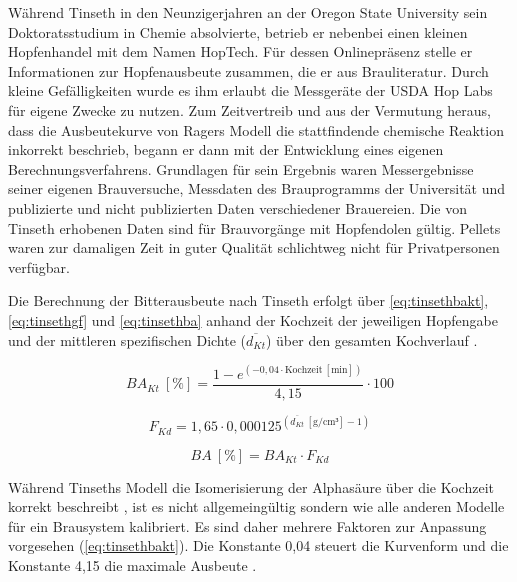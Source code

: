 \documentclass[a4paper,parskip=half]{scrartcl}
\newcommand{\BA}{\mathit{BA}}
\newcommand{\BAKt}{{\mathit{BA}}_{\mathit{Kt}}}
\newcommand{\umin}{\:[\textrm{min}]}
\newcommand{\uden}{\:[\textrm{g/cm³}]}
\newcommand{\uper}{\:[\textrm{\%}]}
\newcommand{\FKd}{F_{\mathit{Kd}}}
\newcommand{\dKt}{\overline{d_{\mathit{Kt}}}}
\begin{document}
Während Tinseth in den Neunzigerjahren an
der Oregon State University sein Doktoratsstudium in Chemie absolvierte,
betrieb er nebenbei einen kleinen Hopfenhandel mit dem Namen HopTech.
Für dessen
Onlinepräsenz stelle er Informationen zur Hopfenausbeute zusammen,
die er aus Brauliteratur.
Durch kleine Gefälligkeiten wurde es ihm erlaubt die Messgeräte
der USDA Hop Labs für eigene Zwecke zu nutzen. Zum Zeitvertreib
und aus der Vermutung heraus, dass die Ausbeutekurve von Ragers
Modell die stattfindende
chemische Reaktion inkorrekt beschrieb, begann er dann mit
der Entwicklung eines eigenen Berechnungsverfahrens.
Grundlagen für sein Ergebnis waren Messergebnisse
seiner eigenen Brauversuche, Messdaten des Brauprogramms der
Universität und publizierte und nicht publizierten Daten verschiedener
Brauereien. Die von Tinseth erhobenen Daten sind für
Brauvorgänge mit Hopfendolen gültig. Pellets waren zur
damaligen Zeit in guter Qualität schlichtweg nicht für Privatpersonen
verfügbar. \parencites[0:55:45-1:08:00]{Beechum2017a}[2:10-6:30]{Smith2011}

Die Berechnung der Bitterausbeute nach Tinseth erfolgt über
\autoref{eq:tinsethbakt}, \autoref{eq:tinsethgf} und \autoref{eq:tinsethba}
anhand der Kochzeit der jeweiligen Hopfengabe und der mittleren
spezifischen Dichte ($\dKt$) über den gesamten Kochverlauf \parencite{Tinseth1997}.

\begin{equation}
\BAKt \uper = \frac{1 - e^{\left(-0,04 \cdot \textrm{Kochzeit} \umin \right)}}{4,15} \cdot 100
\label{eq:tinsethbakt}
\end{equation}

\begin{equation}
\FKd = 1,65 \cdot 0,000125^{\left(\overline{d_{\mathit{Kt}}} \uden - 1 \right)}
\label{eq:tinsethgf}
\end{equation}

\begin{equation}
\BA \uper = \BAKt \cdot \FKd
\label{eq:tinsethba}
\end{equation}



Während Tinseths Modell die Isomerisierung der Alphasäure über
die Kochzeit korrekt beschreibt \parencite[43]{Malowicki2005}, ist es
nicht allgemeingültig sondern wie alle anderen Modelle für ein
Brausystem kalibriert. Es sind daher mehrere Faktoren zur Anpassung
vorgesehen (\autoref{eq:tinsethbakt}). Die Konstante 0,04 steuert die
Kurvenform und die Konstante 4,15  die maximale Ausbeute
\parencite{Tinseth1997}.
\end{document}
